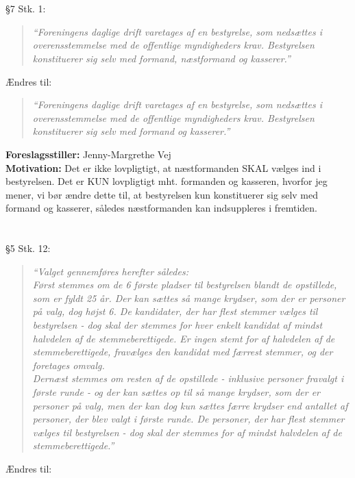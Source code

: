 \documentclass[a4paper,12pt,danish]{article}
\newcommand\cit[1]{
    \begin{quote}
        \textit{``#1''}
    \end{quote}
}
\newcommand\who[1]{
    \textbf{Foreslagsstiller:} #1\\
}
\newcommand\why[1]{
    \textbf{Motivation:} #1\\
}
\newcommand\change[1]{
    \section{}
    #1
}
\begin{document}
\change{
	\S7 Stk. 1:
    \cit{Foreningens daglige drift varetages af en bestyrelse, som nedsættes i overensstemmelse med de offentlige myndigheders krav. Bestyrelsen konstituerer sig selv med formand, næstformand og kasserer.}
    Ændres til:
    \cit{Foreningens daglige drift varetages af en bestyrelse, som nedsættes i overensstemmelse med de offentlige myndigheders krav. Bestyrelsen konstituerer sig selv med formand og kasserer.}
    \who{Jenny-Margrethe Vej}
    \why{Det er ikke lovpligtigt, at næstformanden SKAL vælges ind i bestyrelsen. Det er KUN lovpligtigt mht. formanden og kasseren, hvorfor jeg mener, vi bør ændre dette til, at bestyrelsen kun konstituerer sig selv med formand og kasserer, således næstformanden kan indsuppleres i fremtiden.}
}

\change{
	\S5 Stk. 12:
    \cit{Valget gennemføres herefter således:\\
Først stemmes om de 6 første pladser til bestyrelsen blandt de opstillede, som er fyldt 25 år. Der kan sættes så mange krydser, som der er personer på valg, dog højst 6. De kandidater, der har flest stemmer vælges til bestyrelsen - dog skal der stemmes for hver enkelt kandidat af mindst halvdelen af de stemmeberettigede. Er ingen stemt for af halvdelen af de stemmeberettigede, fravælges den kandidat med færrest stemmer, og der foretages omvalg.\\
Dernæst stemmes om resten af de opstillede - inklusive personer fravalgt i første runde - og der kan sættes op til så mange krydser, som der er personer på valg, men der kan dog kun sættes færre krydser end antallet af personer, der blev valgt i første runde. De personer, der har flest stemmer vælges til bestyrelsen - dog skal der stemmes for af mindst halvdelen af de stemmeberettigede.}
    Ændres til:

}
\end{document}
